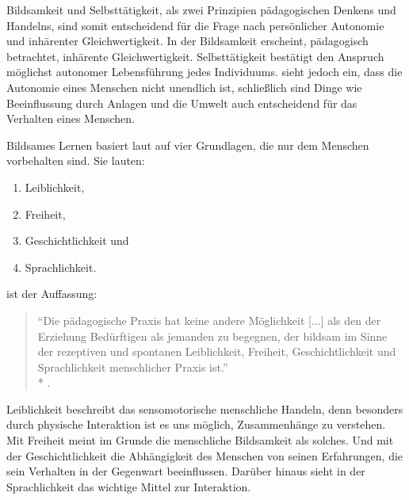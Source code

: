 Bildsamkeit und Selbsttätigkeit, als zwei Prinzipien pädagogischen Denkens und Handelns, sind somit entscheidend für die Frage nach persönlicher Autonomie und inhärenter Gleichwertigkeit.
In der Bildsamkeit erscheint, pädagogisch betrachtet, inhärente Gleichwertigkeit.
Selbsttätigkeit bestätigt den Anspruch möglichst autonomer Lebensführung jedes Individuums.
\citeauthor{benner-2012} sieht jedoch ein, dass die Autonomie eines Menschen nicht unendlich ist, schließlich sind Dinge wie Beeinflussung durch Anlagen und die Umwelt auch entscheidend für das Verhalten eines Menschen.

Bildsames Lernen basiert laut \citeauthor{benner-2012} auf vier Grundlagen, die nur dem Menschen vorbehalten sind.
Sie lauten:

\begin{enumerate}
	\item Leiblichkeit,
	\item Freiheit,
	\item Geschichtlichkeit und
	\item Sprachlichkeit.
\end{enumerate}

\citeauthor{benner-2012} ist der Auffassung:

\begin{quote}
	``Die pädagogische Praxis hat keine andere Möglichkeit [...] als den der Erziehung Bedürftigen als jemanden zu begegnen, der bildsam im Sinne der rezeptiven und spontanen Leiblichkeit, Freiheit, Geschichtlichkeit und Sprachlichkeit menschlicher Praxis ist.''\\*
	\textcite[vgl.][76]{benner-2012}.
\end{quote}

Leiblichkeit beschreibt das sensomotorische menschliche Handeln, denn besonders durch physische Interaktion ist es uns möglich, Zusammenhänge zu verstehen.
Mit Freiheit meint \citeauthor{benner-2012} im Grunde die menschliche Bildsamkeit als solches.
Und mit der Geschichtlichkeit die Abhängigkeit des Menschen von seinen Erfahrungen, die sein Verhalten in der Gegenwart beeinflussen.
Darüber hinaus sieht \citeauthor{benner-2012} in der Sprachlichkeit das wichtige Mittel zur Interaktion.

